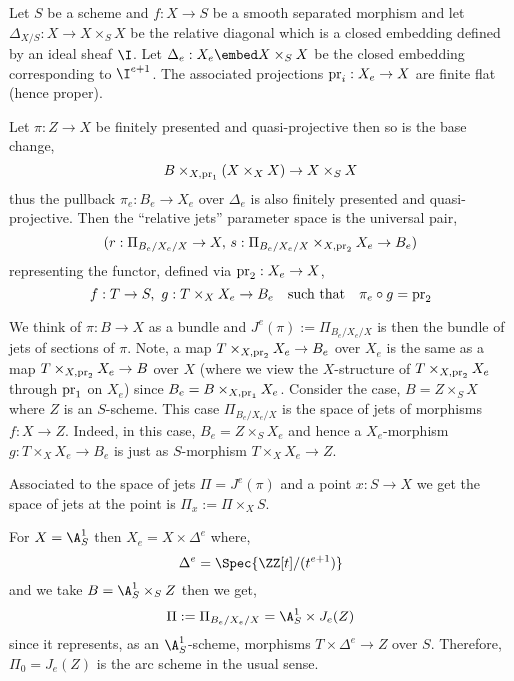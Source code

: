 \documentclass[12pt]{article}
\begin{document}
Let $S$ be a scheme and $f : X \to S$ be a smooth separated morphism and let $\Delta_{X/S} : X \to X \times_S X$ be the relative diagonal which is a closed embedding defined by an ideal sheaf $\I$. Let $\Delta_e : X_e \embed X \times_S X$ be the closed embedding corresponding to $\I^{e+1}$. The associated projections $\mathrm{pr}_i : X_e \to X$ are finite flat (hence proper). 

\begin{defn}
Let $\pi : Z \to X$ be finitely presented and quasi-projective then so is the base change,
\[ B \times_{X, \mathrm{pr}_1} (X \times_X X) \to X \times_S X \]
thus the pullback $\pi_e : B_e \to X_e$ over $\Delta_e$ is also finitely presented and quasi-projective. Then the ``relative jets'' parameter space is the universal pair,
\[ (r : \Pi_{B_e / X_e / X} \to X, \, s : \Pi_{B_e/X_e/X} \times_{X, \mathrm{pr}_2} X_e \to B_e) \]
representing the functor, defined via $\mathrm{pr}_2 : X_e \to X$,
\[ f : T \to S, \,\, g : T \times_X X_e \to B_e \quad \text{such that} \quad \pi_e \circ g = \mathrm{pr}_2 \]  
\end{defn}

\begin{rmk}
We think of $\pi : B \to X$ as a bundle and $J^e(\pi) := \Pi_{B_e/X_e/X}$ is then the bundle of jets of sections of $\pi$. Note, a map $T \times_{X, \mathrm{pr}_2} X_e \to B_e$ over $X_e$ is the same as a map $T \times_{X, \mathrm{pr}_2} X_e \to B$ over $X$ (where we view the $X$-structure of $T \times_{X, \mathrm{pr}_2} X_e$ through $\mathrm{pr}_1$ on $X_e$) since $B_e = B \times_{X, \mathrm{pr}_1} X_e$. Consider the case, $B = Z \times_S X$ where $Z$ is an $S$-scheme. This case $\Pi_{B_e/X_e/X}$ is the space of jets of morphisms $f : X \to Z$. Indeed, in this case, $B_e = Z \times_S X_e$ and hence a $X_e$-morphism $g : T \times_X X_e \to B_e$ is just as $S$-morphism $T \times_X X_e \to Z$.
\end{rmk}

\begin{rmk}
Associated to the space of jets $\Pi = J^e(\pi)$ and a point $x : S \to X$ we get the space of jets at the point is $\Pi_x := \Pi \times_X S$.
\end{rmk}

\begin{example}
For $X = \A^1_S$ then $X_e = X \times \Delta^e$ where,
\[ \Delta^e = \Spec{\ZZ[t]/(t^{e+1})} \]
and we take $B = \A^1_S \times_S Z$ then we get,
\[ \Pi := \Pi_{B_e/X_e/X} = \A^1_S \times J_e(Z) \]
since it represents, as an $\A^1_S$-scheme, morphisms $T \times \Delta^e \to Z$ over $S$. Therefore, $\Pi_0 = J_e(Z)$ is the arc scheme in the usual sense.
\end{example}
\end{document}
